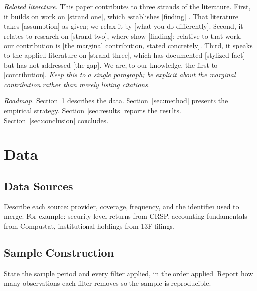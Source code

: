 \documentclass[letterpaper,11pt]{article}
\begin{document}
\textit{Related literature.} This paper contributes to three strands of the
literature. First, it builds on work on [strand one], which establishes
[finding] \citep{Angrist1996_iv}. That literature takes [assumption] as given;
we relax it by [what you do differently]. Second, it relates to research on
[strand two], where \citet{Callaway2021_did} show [finding]; relative to that
work, our contribution is [the marginal contribution, stated concretely].
Third, it speaks to the applied literature on [strand three], which has
documented [stylized fact] but has not addressed [the gap]. We are, to our
knowledge, the first to [contribution]. \textit{Keep this to a single
paragraph; be explicit about the marginal contribution rather than merely
listing citations.}

\textit{Roadmap.} Section~\ref{sec:data} describes the data.
Section~\ref{sec:method} presents the empirical strategy.
Section~\ref{sec:results} reports the results. Section~\ref{sec:conclusion}
concludes.

\section{Data}
\label{sec:data}

\subsection{Data Sources}

Describe each source: provider, coverage, frequency, and the identifier used to
merge. For example: security-level returns from CRSP, accounting fundamentals
from Compustat, institutional holdings from 13F filings.

\subsection{Sample Construction}

State the sample period and every filter applied, in the order applied. Report
how many observations each filter removes so the sample is reproducible.
\end{document}
